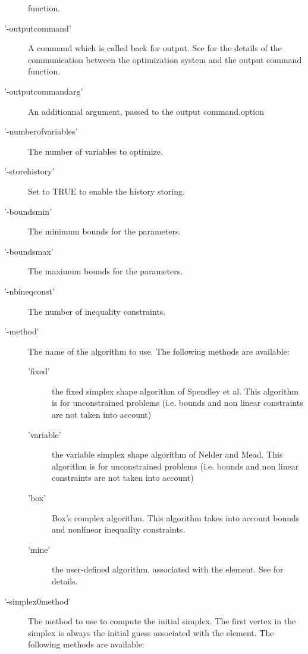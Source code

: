 \begin{Details}
\begin{description}
function.
\item['-outputcommand'] A command which is called back for output. See
 for the details of
the communication between the optimization system and the output command
function.
\item['-outputcommandarg'] An additionnal argument, passed to the output
command.option
\item['-numberofvariables'] The number of variables to optimize.
\item['-storehistory'] Set to TRUE to enable the history storing.
\item['-boundsmin'] The minimum bounds for the parameters.
\item['-boundsmax'] The maximum bounds for the parameters.
\item['-nbineqconst'] The number of inequality constraints.
\item['-method'] The name of the algorithm to use. The following methods are
available:\begin{description}

\item['fixed'] the fixed simplex shape algorithm of Spendley et al. This
algorithm is for unconstrained problems (i.e. bounds and non linear
constraints are not taken into account)
\item['variable'] the variable simplex shape algorithm of Nelder and
Mead. This algorithm is for unconstrained problems (i.e. bounds and
non linear constraints are not taken into account)
\item['box'] Box's complex algorithm. This algorithm takes into
account bounds and nonlinear inequality constraints.
\item['mine'] the user-defined algorithm, associated with the
 element. See
 for details.

\end{description}


\item['-simplex0method'] The method to use to compute the initial simplex.
The first vertex in the simplex is always the initial guess associated
with the  element. The following methods are available:
\begin{description}


\end{description}
\end{description}
\end{Details}
